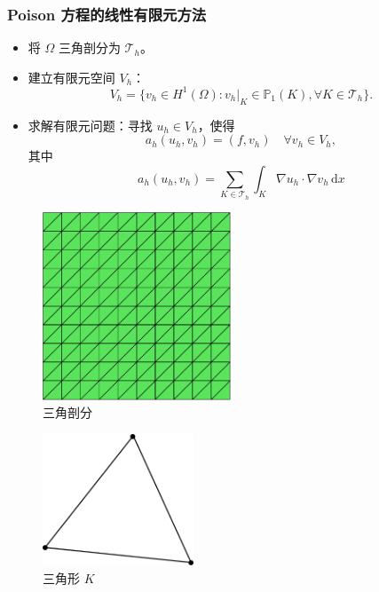\documentclass[notheorems,serif]{beamer}
\begin{document}
\begin{frame}
\frametitle{Poison 方程的线性有限元方法}
\begin{minipage}[b]{0.6\linewidth}
\begin{itemize}
\item 将 $\Omega$ 三角剖分为 $\mathcal{T}_h$。
\item 建立有限元空间 $V_h$：
    $$
    V_h = \{v_h \in H^1(\Omega): v_h|_K \in \mathbb{P}_1(K), \forall K \in
    \mathcal{T}_h\}.
    $$
\item 求解有限元问题：寻找 $u_h \in V_h$，使得
    $$
    a_h(u_h, v_h) = (f, v_h) \quad \forall v_h \in V_h,
    $$
    其中
    $$
    a_h(u_h, v_h) = \sum_{K \in \mathcal{T}_h} \int_K \nabla u_h \cdot \nabla v_h \,
    \mathrm{d} x
    $$
\end{itemize}
\vspace{15pt}
\end{minipage}
\hfill
\begin{minipage}[b]{0.38\linewidth}
    \begin{figure}[htpb]
        \centering
        \includegraphics[width=0.5\textwidth]{../figures/struct_triangle_mesh.pdf}
        \caption{三角剖分}
    \end{figure}
    \begin{figure}[htpb]
        \centering
        \includegraphics[width=0.4\textwidth]{../figures/triangle.pdf}
        \caption{三角形 $K$}
    \end{figure}
\end{minipage}
\end{frame}
\end{document}
